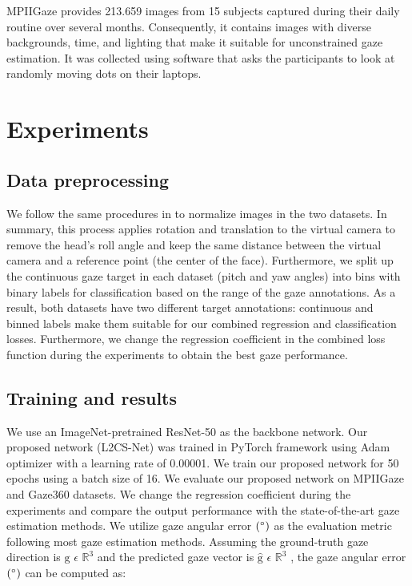 \documentclass{article}
\begin{document}
MPIIGaze \cite{Mpiigaze1} provides 213.659 images from 15 subjects captured during their daily routine over several months. Consequently, it contains images with diverse backgrounds, time, and lighting that make it suitable for unconstrained gaze estimation. It was collected using software that asks the participants to look at randomly moving dots on their laptops.




\section{Experiments}
\label{sec:experiments}
\subsection{Data preprocessing}
We follow the same procedures in \cite{Mpiigaze1} to normalize images in the two datasets. In summary, this process applies rotation and translation to the virtual camera to remove the head's roll angle and keep the same distance between the virtual camera and a reference point (the center of the face). Furthermore, we split up the continuous gaze target in each dataset (pitch and yaw angles) into bins with binary labels for classification based on the range of the gaze annotations. As a result, both datasets have two different target annotations: continuous and binned labels make them suitable for our combined regression and classification losses. Furthermore, we change the regression coefficient in the combined loss function during the experiments to obtain the best gaze performance.


\subsection{Training and results}
We use an ImageNet-pretrained ResNet-50 as the backbone network. Our proposed network (L2CS-Net) was trained in PyTorch framework using Adam optimizer with a learning rate of 0.00001. We train our proposed network for 50 epochs using a batch size of 16. We evaluate our proposed network on MPIIGaze and Gaze360 datasets. We change the regression coefficient during the experiments and compare the output performance with the state-of-the-art gaze estimation methods. We utilize gaze angular error $(\degree)$ as the evaluation metric following most gaze estimation methods. Assuming the ground-truth gaze direction is $\mathrm{g}$  $\epsilon$ $\mathbb{R}^{3}$  and the predicted gaze vector is $\mathrm{\hat{g}}$  $\epsilon$ $\mathbb{R}^{3}$ , the gaze angular error  $(\degree)$ can be computed as:
\end{document}
